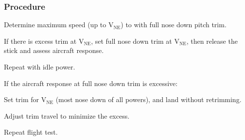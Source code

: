 % 
% 
%
\subsubsection*{Procedure}
  \begin{compactenum}
    \item Determine maximum speed (up to $\mathrm{V_{NE}}$) to with full nose down pitch trim.
    \item If there is excess trim at $\mathrm{V_{NE}}$, set full nose down trim at $\mathrm{V_{NE}}$, then release the stick and assess aircraft response.
    \item Repeat with idle power.
    \item If the aircraft response at full nose down trim is excessive:
    \begin{compactenum}
      \item Set trim for $\mathrm{V_{NE}}$ (most nose down of all powers), and land without retrimming.  
      \item Adjust trim travel to minimize the excess.
      \item Repeat flight test.
      \end{compactenum}
    \end{compactenum}
